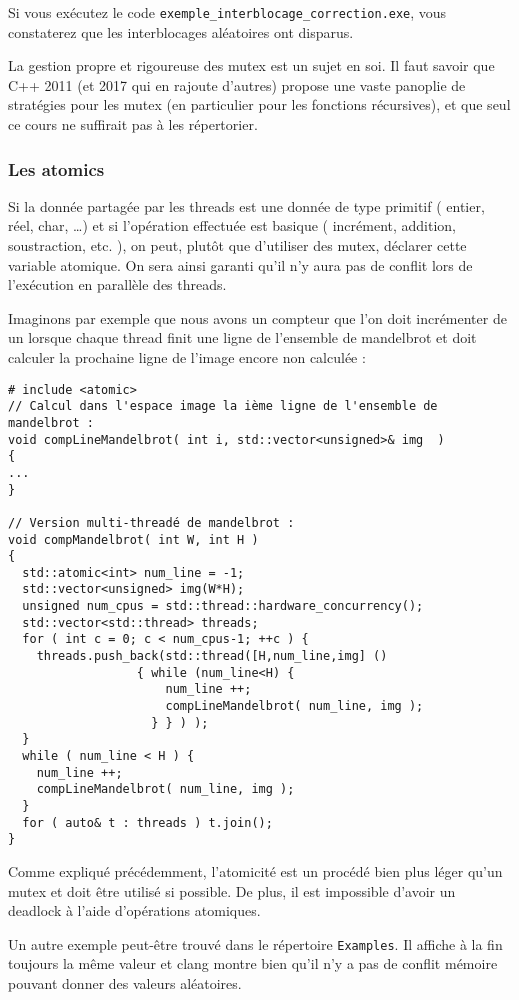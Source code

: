 \documentclass[fleqn,11pt]{article}
\begin{document}
Si vous exécutez le code \texttt{exemple\_interblocage\_correction.exe}, vous constaterez que les
interblocages aléatoires ont disparus. 

La gestion propre et rigoureuse des mutex est un sujet en soi. Il faut savoir que C++ 2011 (et 2017
qui en rajoute d'autres) propose une vaste panoplie de stratégies pour les mutex (en particulier pour les fonctions récursives), et que seul ce cours ne suffirait pas à les répertorier.

\subsubsection{Les atomics}

Si la donnée partagée par les threads est une donnée de type primitif ( entier, réel, char, \ldots ) et si l'opération effectuée est basique ( incrément, addition, soustraction, etc. ), on peut, plutôt que d'utiliser des mutex, déclarer cette variable atomique. On sera ainsi garanti qu'il n'y aura pas de conflit lors de l'exécution en parallèle des threads.

Imaginons par exemple que nous avons un compteur que l'on doit incrémenter de un lorsque chaque thread finit une ligne de l'ensemble de mandelbrot et doit calculer la prochaine ligne de l'image encore non calculée :

\begin{lstlisting}
# include <atomic>
// Calcul dans l'espace image la ième ligne de l'ensemble de mandelbrot :
void compLineMandelbrot( int i, std::vector<unsigned>& img  )
{
...
}

// Version multi-threadé de mandelbrot :
void compMandelbrot( int W, int H )
{
  std::atomic<int> num_line = -1;
  std::vector<unsigned> img(W*H);
  unsigned num_cpus = std::thread::hardware_concurrency();
  std::vector<std::thread> threads;
  for ( int c = 0; c < num_cpus-1; ++c ) {
    threads.push_back(std::thread([H,num_line,img] () 
				  { while (num_line<H) { 
				      num_line ++;
				      compLineMandelbrot( num_line, img );
				    } } ) );
  }
  while ( num_line < H ) {
    num_line ++;
    compLineMandelbrot( num_line, img );
  }
  for ( auto& t : threads ) t.join();
}
\end{lstlisting}

Comme expliqué précédemment, l'atomicité est un procédé bien plus léger qu'un mutex et doit être utilisé si possible. De plus, il est impossible d'avoir un deadlock à l'aide d'opérations atomiques.

Un autre exemple peut-être trouvé dans le répertoire \texttt{Examples}. Il affiche à la fin toujours la même
valeur et clang montre bien qu'il n'y a pas de conflit mémoire pouvant donner des valeurs aléatoires.
\end{document}
